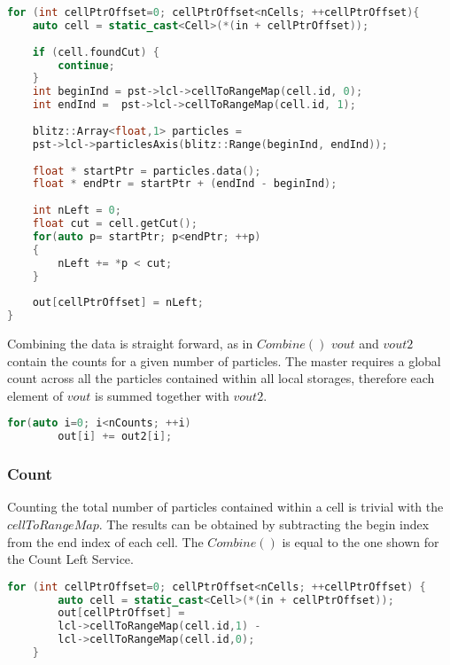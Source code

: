 \documentclass[]{article}
\begin{document}
\begin{lstlisting}[language=c++, caption=Part of the Count Left Service() method, label=ctl]
for (int cellPtrOffset=0; cellPtrOffset<nCells; ++cellPtrOffset){
	auto cell = static_cast<Cell>(*(in + cellPtrOffset));
	
	if (cell.foundCut) {
		continue;
	}
	int beginInd = pst->lcl->cellToRangeMap(cell.id, 0);
	int endInd =  pst->lcl->cellToRangeMap(cell.id, 1);
	
	blitz::Array<float,1> particles =
	pst->lcl->particlesAxis(blitz::Range(beginInd, endInd));
	
	float * startPtr = particles.data();
	float * endPtr = startPtr + (endInd - beginInd);
	
	int nLeft = 0;
	float cut = cell.getCut();
	for(auto p= startPtr; p<endPtr; ++p)
	{
		nLeft += *p < cut;
	}
	
	out[cellPtrOffset] = nLeft;
}
\end{lstlisting}

Combining the data is straight forward, as in $Combine()$ $vout$ and $vout2$ contain the counts for a given number of particles. The master requires a global count across all the particles contained within all local storages, therefore each element of $vout$ is summed together with $vout2$. 

\begin{lstlisting}[language=c++, caption=Part of the Count Left Combine() method, label=ctlc]
	for(auto i=0; i<nCounts; ++i)
		out[i] += out2[i];
\end{lstlisting}

\subsubsection{Count}

Counting the total number of particles contained within a cell is trivial with the $cellToRangeMap$. The results can be obtained by subtracting the begin index from the end index of each cell. The $Combine()$ is equal to the one shown for the Count Left Service.

\begin{lstlisting}[language=c++, caption=Part of Count Service() method]
	for (int cellPtrOffset=0; cellPtrOffset<nCells; ++cellPtrOffset) {
		auto cell = static_cast<Cell>(*(in + cellPtrOffset));
		out[cellPtrOffset] = 
		lcl->cellToRangeMap(cell.id,1) - 
		lcl->cellToRangeMap(cell.id,0);
	}
\end{lstlisting}
\end{document}
